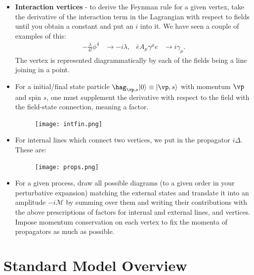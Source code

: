 \documentclass[relqm.tex]{subfiles}
\begin{document}
\begin{itemize}
    \item \textbf{Interaction vertices} - to derive the Feynman rule for a given vertex, take the derivative of the interaction term in the Lagrangian with respect to fields until you obtain a constant and put an $i$ into it. 
        We have seen a couple of examples of this:
        \begin{align}
            -\frac{\lambda}{4!}\phi^4 &\to -i\lambda, & \bar{e}A_\mu\gamma^\mu e &\to i\gamma_\mu.
        \end{align}
        The vertex is represented diagrammatically by each of the fields being a line joining in a point. 
    \item For a initial/final state particle $\hag_{\vp,s}|0\rangle \equiv |\vp,s\rangle$ with momentum $\vp$ and spin $s$, one must supplement the derivative with respect to the field with the field-state connection, meaning a factor.
        \begin{figure}[H]
            \centering
            \texttt{[image: intfin.png]}
        \end{figure}
    \item For internal lines which connect two vertices, we put in the propagator $i\Delta$.
        These are:
        \begin{figure}[H]
            \centering
            \texttt{[image: props.png]}
        \end{figure}
    \item For a given process, draw all possible diagrams (to a given order in your perturbative expansion) matching the external states and translate it into an amplitude $-i\mathcal{M}$ by summing over them and writing their contributions with the above prescriptions of factors for internal and external lines, and vertices.
        Impose momentum conservation on each vertex to fix the momenta of propagators as much as possible.
\end{itemize}

\chapter{Standard Model Overview}
\end{document}
